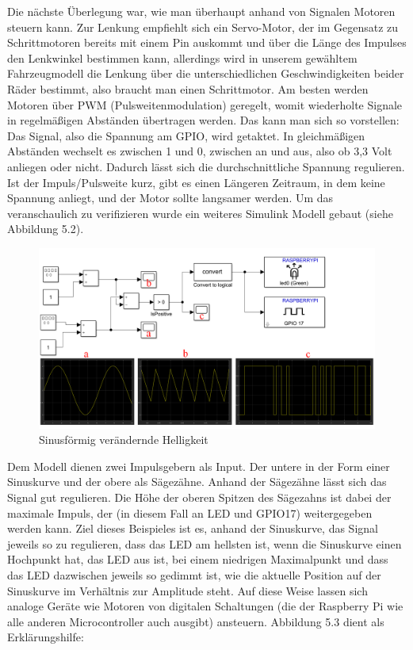 Die nächste Überlegung war, wie man überhaupt anhand von Signalen Motoren steuern kann. Zur Lenkung empfiehlt sich ein Servo-Motor, der im Gegensatz zu Schrittmotoren bereits mit einem Pin auskommt und über die Länge des Impulses den Lenkwinkel bestimmen kann, allerdings wird in unserem gewähltem Fahrzeugmodell die Lenkung über die unterschiedlichen Geschwindigkeiten beider Räder bestimmt, also braucht man einen Schrittmotor. Am besten werden Motoren über PWM (Pulsweitenmodulation) geregelt, womit wiederholte Signale in regelmäßigen Abständen übertragen werden. Das kann man sich so vorstellen: Das Signal, also die Spannung am GPIO, wird getaktet. In gleichmäßigen Abständen wechselt es zwischen 1 und 0, zwischen an und aus, also ob 3,3 Volt anliegen oder nicht. Dadurch lässt sich die durchschnittliche Spannung regulieren. Ist der Impuls/Pulsweite kurz, gibt es einen Längeren Zeitraum, in dem keine Spannung anliegt, und der Motor sollte langsamer werden. Um das veranschaulich zu verifizieren wurde ein weiteres Simulink Modell gebaut (siehe Abbildung 5.2). \\
\begin{figure}[htb]
  \centering  
  \includegraphics[scale=1]{img/saw.png}
  \caption{Sinusförmig verändernde Helligkeit}
  \label{fig:Sägezahnmodell zum Kreisförmigen Dimmungsverlauf einer LED}
\end{figure}
Dem Modell dienen zwei Impulsgebern als Input. Der untere in der Form einer Sinuskurve und der obere als Sägezähne. Anhand der Sägezähne lässt sich das Signal gut regulieren. Die Höhe der oberen Spitzen des Sägezahns ist dabei der maximale Impuls, der (in diesem Fall an LED und GPIO17) weitergegeben werden kann. Ziel dieses Beispieles ist es, anhand der Sinuskurve, das Signal jeweils so zu regulieren, dass das LED am hellsten ist, wenn die Sinuskurve einen Hochpunkt hat, das LED aus ist, bei einem niedrigen Maximalpunkt und dass das LED dazwischen jeweils so gedimmt ist, wie die aktuelle Position auf der Sinuskurve im Verhältnis zur Amplitude steht. Auf diese Weise lassen sich analoge Geräte wie Motoren von digitalen Schaltungen (die der Raspberry Pi wie alle anderen Microcontroller auch ausgibt) ansteuern. Abbildung 5.3 dient als Erklärungshilfe:
